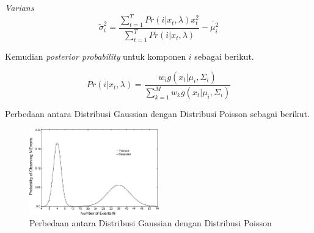 \textit{Varians}
\begin{equation}
    \label{eq:gmm_em_varians}
    \tilde{\sigma}^2_i = \frac{\sum_{t=1}^{T}Pr(i|x_t, \lambda) x_t^2}{\sum_{t=1}^{T}Pr(i|x_t, \lambda)}  - \tilde{\mu_i^2}
\end{equation}

Kemudian \textit{posterior probability} untuk komponen $i$ sebagai berikut.

\begin{equation}
    \label{eq:gmm_em_posterior_probability}
    Pr(i|x_t, \lambda) = \frac{w_i g(x_t|\mu_i, \Sigma_i)}{\sum_{k=1}^{M}w_k g(x_t|\mu_i, \Sigma_i)}
\end{equation}

Perbedaan antara Distribusi Gaussian dengan Distribusi Poisson sebagai berikut.

\begin{figure}[H]
    \centering
    \includegraphics[width=0.50\textwidth]{gambar/Difference-between-Gaussian-and-Poisson-distributions-Graph-shows-two-Poisson-and-two.png}
    \caption{Perbedaan antara Distribusi Gaussian dengan Distribusi Poisson \cite{rzeszotarski_physics_tutorial}}
    \label{gambar:flowchart_automatic_tag}
\end{figure}




